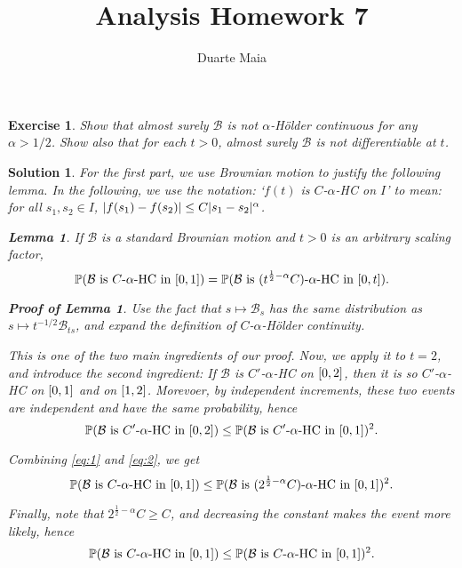 \documentclass{article}
\title{Analysis Homework 7}
\author{Duarte Maia}
\newtheorem{lemma}{Lemma}
\newtheorem{ex}{Exercise}
\theoremstyle{nonumberplain}
\newtheorem{sol}{Solution}
\newtheorem{lemmaproof}{Proof of Lemma}
\DeclarePairedDelimiter{\abs}{\lvert}{\rvert}
\newcommand{\PP}{\mathbb{P}}
\newcommand{\Brwn}{\mathcal{B}}
\begin{document}
\maketitle

\begin{ex}
Show that almost surely $\Brwn$ is not $\alpha$-Hölder continuous for any $\alpha > 1/2$. Show also that for each $t > 0$, almost surely $\Brwn$ is not differentiable at $t$.
\end{ex}

\begin{sol}
For the first part, we use Brownian motion to justify the following lemma. In the following, we use the notation: `$f(t)$ is $C$-$\alpha$-HC on $I$' to mean: for all $s_1,s_2 \in I$, $\abs{f(s_1)-f(s_2)} \leq C \abs{s_1-s_2}^\alpha$.
\begin{lemma}
If $\Brwn$ is a standard Brownian motion and $t > 0$ is an arbitrary scaling factor,
\begin{equation}\label{eq:1}
\PP(\text{$\Brwn$ is $C$-$\alpha$-HC in $\interval01$}) = \PP(\text{$\Brwn$ is $(t^{\frac12 - \alpha} C)$-$\alpha$-HC in $\interval0t$}).
\end{equation}
\end{lemma}
\begin{lemmaproof}
Use the fact that $s \mapsto \Brwn_s$ has the same distribution as $s \mapsto t^{-1/2} \Brwn_{ts}$, and expand the definition of $C$-$\alpha$-Hölder continuity.
\end{lemmaproof}

This is one of the two main ingredients of our proof. Now, we apply it to $t = 2$, and introduce the second ingredient: If $\Brwn$ is $C'$-$\alpha$-HC on $\interval02$, then it is so $C'$-$\alpha$-HC on $\interval01$ and on $\interval12$. Morevoer, by independent increments, these two events are independent and have the same probability, hence
\begin{equation}\label{eq:2}
\PP(\text{$\Brwn$ is $C'$-$\alpha$-HC in $\interval02$}) \leq \PP(\text{$\Brwn$ is $C'$-$\alpha$-HC in $\interval01$})^2.
\end{equation}

Combining \eqref{eq:1} and \eqref{eq:2}, we get
\begin{equation}
\PP(\text{$\Brwn$ is $C$-$\alpha$-HC in $\interval01$}) \leq \PP(\text{$\Brwn$ is $(2^{\frac12 - \alpha} C)$-$\alpha$-HC in $\interval01$})^2.
\end{equation}

Finally, note that $2^{\frac12 - \alpha} C \geq C$, and decreasing the constant makes the event more likely, hence
\begin{equation}
\PP(\text{$\Brwn$ is $C$-$\alpha$-HC in $\interval01$}) \leq \PP(\text{$\Brwn$ is $C$-$\alpha$-HC in $\interval01$})^2.
\end{equation}


\end{sol}
\end{document}
